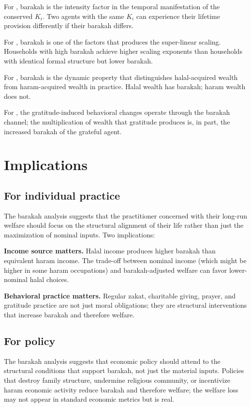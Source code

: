 For , barakah is the intensity factor
in the temporal manifestation of the conserved $K_i$. Two agents
with the same $K_i$ can experience their lifetime provision
differently if their barakah differs.

For , barakah is one of the factors
that produces the super-linear scaling. Households with high
barakah achieve higher scaling exponents than households with
identical formal structure but lower barakah.

For , barakah is the dynamic property that
distinguishes halal-acquired wealth from haram-acquired wealth in
practice. Halal wealth has barakah; haram wealth does not.

For , the gratitude-induced behavioral changes
operate through the barakah channel; the multiplication of wealth
that gratitude produces is, in part, the increased barakah of the
grateful agent.

\section{Implications}
\label{sec:bar-implications}

\subsection{For individual practice}

The barakah analysis suggests that the practitioner concerned with
their long-run welfare should focus on the structural alignment of
their life rather than just the maximization of nominal inputs.
Two implications:

\textbf{Income source matters.} Halal income produces higher
barakah than equivalent haram income. The trade-off between
nominal income (which might be higher in some haram occupations)
and barakah-adjusted welfare can favor lower-nominal halal
choices.

\textbf{Behavioral practice matters.} Regular zakat, charitable
giving, prayer, and gratitude practice are not just moral
obligations; they are structural interventions that increase
barakah and therefore welfare.

\subsection{For policy}

The barakah analysis suggests that economic policy should attend
to the structural conditions that support barakah, not just the
material inputs. Policies that destroy family structure, undermine
religious community, or incentivize haram economic activity
reduce barakah and therefore welfare; the welfare loss may not
appear in standard economic metrics but is real.

